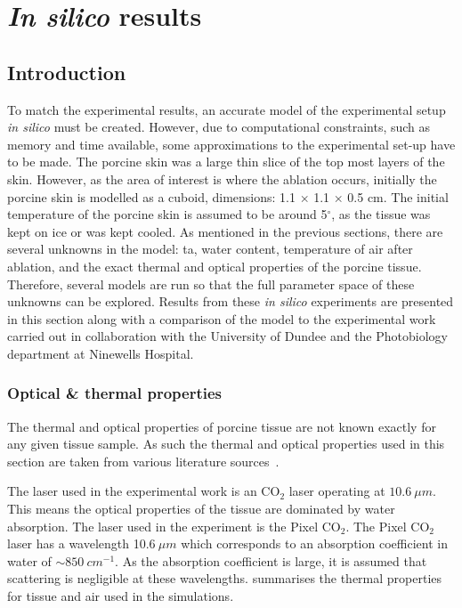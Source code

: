 


\section{\textit{In silico} results} 

\subsection{Introduction}

To match the experimental results,  an accurate model of the experimental setup \textit{in silico} must be created. However, due to computational constraints, such as memory and time available, some approximations to the experimental set-up have to be made. The porcine skin was a large thin slice of the top most layers of the skin. However, as the area of interest is where the ablation occurs, initially the porcine skin is modelled as a cuboid, dimensions:  1.1 $\times$ 1.1 $\times$ 0.5 cm. The initial temperature of the porcine skin is assumed to be around 5$^{\circ}$, as the tissue was kept on ice or was kept cooled. 
As mentioned in the previous sections, there are several unknowns in the model: \gls*{ta}, water content, temperature of air after ablation, and the exact thermal and optical properties of the porcine tissue. Therefore, several models are run so that the full parameter space of these unknowns can be explored.
Results from these \textit{in silico} experiments are presented in this section along with a comparison of the model to the experimental work carried out in collaboration with the University of Dundee and the Photobiology department at Ninewells Hospital.


\subsubsection*{Optical \& thermal properties}
\label{sec:opticalprops}
The thermal and optical properties of porcine tissue are not known exactly for any given tissue sample. As such the thermal and optical properties used in this section are taken from various literature sources~\cite{}.

The laser used in the experimental work is an CO$_2$ laser operating at $10.6\ \mu m$. This means the optical properties of the tissue are dominated by water absorption. The laser used in the experiment is the Pixel CO$_2$\cite{pixelco2}. The Pixel CO$_2$ laser has a wavelength 10.6$~\mu m$ which corresponds to an absorption coefficient in water of $\sim 850~cm^{-1}$. As the absorption coefficient is large, it is assumed that scattering is negligible at these wavelengths.
 summarises the thermal properties for tissue and air used in the simulations.  

